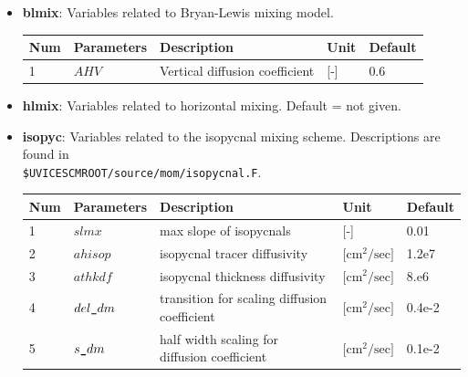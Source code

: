 \documentclass[a4paper]{article}
\begin{document}
\begin{itemize}
{\begin{longtable}{lllll}
   \end{longtable}}
   
   
\item \textbf{blmix}: Variables related to Bryan-Lewis mixing model. 
{\footnotesize
\begin{longtable}{lllll} \hline
  Num  & Parameters                       & Description                                   & Unit                          & Default    \\ \hline 
  1    & $AHV$                            & Vertical diffusion coefficient                & [-]                           & 0.6        \\ \hline
   \end{longtable}}
\item \textbf{hlmix}: Variables related to horizontal mixing. Default = not given.
\item \textbf{isopyc}: Variables related to the isopycnal mixing scheme. Descriptions are found in \\ \verb|$UVICESCMROOT/source/mom/isopycnal.F|.
{\footnotesize
\begin{longtable}{lllll} \hline
  Num  & Parameters                       & Description                                   & Unit                          & Default    \\ \hline 
  1    & $slmx$                           & max slope of isopycnals                       & [-]                           & 0.01       \\
  2    & $ahisop$                         & isopycnal tracer diffusivity                  & [$\mathrm{cm^2/sec}]$         & 1.2e7      \\
  3    & $athkdf$                         & isopycnal thickness diffusivity               & [$\mathrm{cm^2/sec}]$         & 8.e6       \\
  4    & $del\verb|_|dm$                  & transition for scaling diffusion coefficient  & [$\mathrm{cm^2/sec}]$         & 0.4e-2     \\
  5    & $s\verb|_|dm$                    & half width scaling for diffusion coefficient  & [$\mathrm{cm^2/sec}]$         & 0.1e-2     \\ \hline
   \end{longtable}}


\end{itemize}
\end{document}
